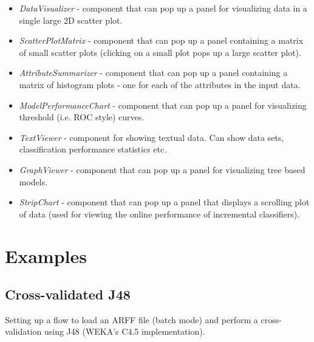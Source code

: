 \begin{itemize}
	\item \textit{DataVisualizer} - component that can pop up a panel for 
	visualizing data in a single large 2D scatter plot.
	\item \textit{ScatterPlotMatrix} - component that can pop up a panel 
	containing a matrix of small scatter plots (clicking on a small plot 
	pops up a large scatter plot).
	\item \textit{AttributeSummarizer} - component that can pop up a panel 
	containing a matrix of histogram plots - one for each of the attributes 
	in the input data.
	\item \textit{ModelPerformanceChart} - component that can pop up a 
	panel for visualizing threshold (i.e. ROC style) curves.
	\item \textit{TextViewer} - component for showing textual data. Can show 
	data sets, classification performance statistics etc.
	\item \textit{GraphViewer} - component that can pop up a panel for 
	visualizing tree based models.
	\item \textit{StripChart} - component that can pop up a panel that displays 
	a scrolling plot of data (used for viewing the online performance of 
	incremental classifiers).
\end{itemize}


\newpage
\section{Examples}


\subsection{Cross-validated J48}
Setting up a flow to load an ARFF file (batch mode) and
perform a cross-validation using J48 (WEKA's C4.5 implementation).

\begin{center}
\end{center}

